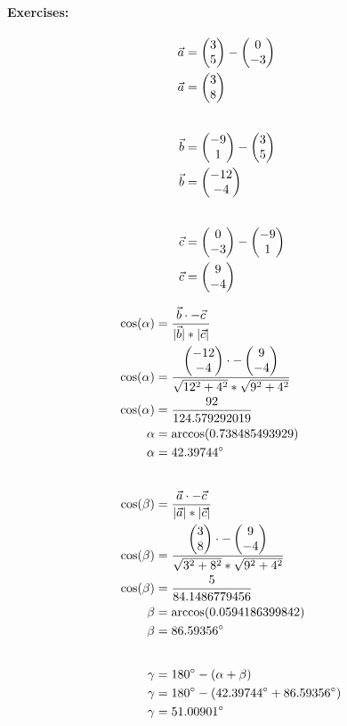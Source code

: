 \paragraph{Exercises:}
\begin{align}
   \vec{a} &= \begin{pmatrix}
       3 \\ 
       5
   \end{pmatrix} - 
   \begin{pmatrix}
       0 \\ 
       -3
   \end{pmatrix} \\
   \vec{a} &= \begin{pmatrix} 3 \\ 8 \end{pmatrix} \\[20pt]
   \vec{b} &= \begin{pmatrix}
       -9 \\ 
       1
   \end{pmatrix} - 
   \begin{pmatrix}
       3 \\ 
       5
   \end{pmatrix} \\
   \vec{b} &= \begin{pmatrix} -12 \\ -4 \end{pmatrix} \\[20pt]
   \vec{c} &= \begin{pmatrix}
       0 \\ 
       -3
   \end{pmatrix} - 
   \begin{pmatrix}
       -9 \\ 
       1
   \end{pmatrix} \\
   \vec{c} &= \begin{pmatrix} 9 \\ -4 \end{pmatrix}
\end{align}

\begin{align}
   \cos(\alpha) &= \frac{\vec{b} \cdot -\vec{c}}{|\vec{b}| * |\vec{c}|} \\
   \cos(\alpha) &= \frac{\begin{pmatrix} -12 \\ -4 \end{pmatrix} \cdot -\begin{pmatrix} 9 \\ -4 \end{pmatrix}}{\sqrt{12^2 + 4^2} * \sqrt{9^2 + 4^2}} \\
   \cos(\alpha) &= \frac{92}{124.579292019} \\
   \alpha &= \arccos(0.738485493929) \\
   \alpha &= 42.39744^\circ \\[20pt]
   \cos(\beta) &= \frac{\vec{a} \cdot -\vec{c}}{|\vec{a}| * |\vec{c}|} \\
   \cos(\beta) &= \frac{\begin{pmatrix} 3 \\ 8 \end{pmatrix} \cdot -\begin{pmatrix} 9 \\ -4 \end{pmatrix}}{\sqrt{3^2 + 8^2} * \sqrt{9^2 + 4^2}} \\
   \cos(\beta) &= \frac{5}{84.1486779456} \\
   \beta &= \arccos(0.0594186399842) \\
   \beta &= 86.59356^\circ \\[20pt]
   \gamma &= 180^\circ - (\alpha + \beta) \\
   \gamma &= 180^\circ - (42.39744^\circ + 86.59356^\circ) \\
   \gamma &= 51.00901^\circ 
\end{align}
